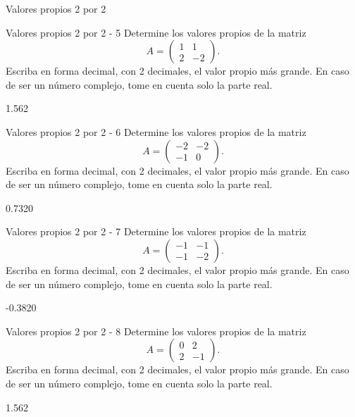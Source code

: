 \documentclass[a4,11pt]{aleph-notas}
\begin{document}
\begin{quiz}{Valores propios 2 por 2}
\begin{numerical}[tolerance=0.01]%
    {Valores propios 2 por 2 - 5}
    Determine los valores propios de la matriz
    \[
    A = \begin{pmatrix}
    1 & 1 \\
    2 & -2
    \end{pmatrix}.
    \]
    Escriba en forma decimal, con 2 decimales, el valor propio más grande. En caso de ser un número complejo, tome en cuenta solo la parte real.
    \item[] 1.562
\end{numerical}

\begin{numerical}[tolerance=0.01]%
    {Valores propios 2 por 2 - 6}
    Determine los valores propios de la matriz
    \[
    A = \begin{pmatrix}
    -2 & -2 \\
    -1 & 0
    \end{pmatrix}.
    \]
    Escriba en forma decimal, con 2 decimales, el valor propio más grande. En caso de ser un número complejo, tome en cuenta solo la parte real.
    \item[] 0.7320
\end{numerical}

\begin{numerical}[tolerance=0.01]%
    {Valores propios 2 por 2 - 7}
    Determine los valores propios de la matriz
    \[
    A = \begin{pmatrix}
    -1 & -1 \\
    -1 & -2
    \end{pmatrix}.
    \]
    Escriba en forma decimal, con 2 decimales, el valor propio más grande. En caso de ser un número complejo, tome en cuenta solo la parte real.
    \item[] -0.3820
\end{numerical}

\begin{numerical}[tolerance=0.01]%
    {Valores propios 2 por 2 - 8}
    Determine los valores propios de la matriz
    \[
    A = \begin{pmatrix}
    0 & 2 \\
    2 & -1
    \end{pmatrix}.
    \]
    Escriba en forma decimal, con 2 decimales, el valor propio más grande. En caso de ser un número complejo, tome en cuenta solo la parte real.
    \item[] 1.562
\end{numerical}


\end{quiz}
\end{document}
